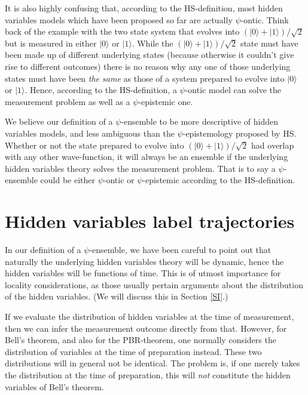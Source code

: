\documentclass[superscriptaddress,floatfix,nofootinbib,12pt]{revtex4-2}
\begin{document}
It is also highly confusing that, according to the HS-definition, most hidden variables models which have been proposed so far are actually $\psi$-ontic. Think back of the example with the two state system that evolves into $(|0\rangle + |1\rangle)/\sqrt{2}$ but is measured in either $|0 \rangle$ or $|1\rangle$. While the $(|0\rangle + |1\rangle)/\sqrt{2}$ state must have been made up of different underlying states (because otherwise it couldn't give rise to different outcomes) there is no reason why any one of those underlying states must have been \emph{the same} as those of a system prepared to evolve into $|0\rangle$ or $|1 \rangle$. Hence, according to the HS-definition, a $\psi$-ontic model can solve the measurement problem as well as a $\psi$-epistemic one. 

We believe our definition of a $\psi$-ensemble to be more descriptive of hidden variables models, and less ambiguous than the $\psi$-epistemology proposed by HS. 
Whether or not the state prepared to evolve into $(|0\rangle + |1\rangle)/\sqrt{2}$ had overlap with any other wave-function, it will always be an ensemble if the underlying hidden variables theory solves the measurement problem. That is to say a $\psi$-ensemble could be either $\psi$-ontic or $\psi$-epistemic according to the HS-definition. 

\section{Hidden variables label trajectories}
\label{trajectories}

In our definition of a $\psi$-ensemble, we have been careful to point out that naturally the underlying hidden variables theory will be dynamic, hence the hidden variables will be functions of time. This is of utmost importance for locality considerations, as those usually pertain arguments about the distribution of the hidden variables. (We will discuss this in Section \ref{SI}.)

If we evaluate the distribution of hidden variables at the time of measurement, then we can infer the measurement outcome directly from that. However, for Bell's theorem, and also for the {\sc PBR}-theorem, one normally considers the distribution of variables at the time of preparation instead. These two distributions will in general not be identical. The problem is, if one merely takes the distribution at the time of preparation, this will \emph{not} constitute the hidden variables of Bell's theorem. 
\end{document}
